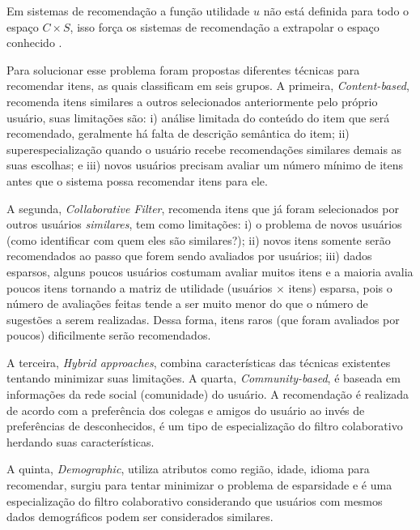 \documentclass{acm_proc_article-sp}
\begin{document}
Em sistemas de recomenda\c{c}{\~a}o a fun\c{c}{\~a}o utilidade \(u\) n{\~a}o est{\'a} definida para todo o espa\c{c}o \(C \times S\), isso for\c{c}a os sistemas de recomenda\c{c}{\~a}o a extrapolar o espa\c{c}o conhecido \cite{Adomavicius2005}.

Para solucionar esse problema foram propostas diferentes t{\'e}cnicas para recomendar itens, as quais \cite{Paiva2013} classificam em seis grupos. A primeira, \emph{Content-based}, recomenda itens similares a outros selecionados anteriormente pelo pr{\'o}prio usu{\'a}rio, suas limita\c{c}{\~o}es s{\~a}o: i) an{\'a}lise limitada do conte{\'u}do do item que ser{\'a} recomendado, geralmente h{\'a} falta de descri\c{c}{\~a}o sem{\^a}ntica do item; ii) superespecializa\c{c}{\~a}o quando o usu{\'a}rio recebe recomenda\c{c}{\~o}es similares demais as suas escolhas; e iii) novos usu{\'a}rios precisam avaliar um n{\'u}mero m{\'i}nimo de itens antes que o sistema possa recomendar itens para ele.

A segunda, \emph{Collaborative Filter}, recomenda itens que j{\'a} foram selecionados por outros usu{\'a}rios \emph{similares}, tem como limita\c{c}{\~o}es: i) o problema de novos usu{\'a}rios (como identificar com quem eles s{\~a}o similares?); ii) novos itens somente ser{\~a}o recomendados ao passo que forem sendo avaliados por usu{\'a}rios; iii) dados esparsos, alguns poucos usu{\'a}rios costumam avaliar muitos itens e a maioria avalia poucos itens tornando a matriz de utilidade (usu{\'a}rios \(\times\) itens) esparsa, pois o n{\'u}mero de avalia\c{c}{\~o}es feitas tende a ser muito menor do que o n{\'u}mero de sugest{\~o}es a serem realizadas. Dessa forma, itens raros (que foram avaliados por poucos) dificilmente ser{\~a}o recomendados.

A terceira, \emph{Hybrid approaches}, combina caracter{\'i}sticas das t{\'e}cnicas existentes tentando minimizar suas limita\c{c}{\~o}es. A quarta, \emph{Community-based}, {\'e} baseada em informa\c{c}{\~o}es da rede social (comunidade) do usu{\'a}rio. A recomenda\c{c}{\~a}o {\'e} realizada de acordo com a prefer{\^e}ncia dos colegas e amigos do usu{\'a}rio ao inv{\'e}s de prefer{\^e}ncias de desconhecidos, {\'e} um tipo de especializa\c{c}{\~a}o do filtro colaborativo herdando suas caracter{\'i}sticas.

A quinta, \emph{Demographic}, utiliza atributos como regi{\~a}o, idade, idioma para recomendar, surgiu para tentar minimizar o problema de esparsidade e {\'e} uma especializa\c{c}{\~a}o do filtro colaborativo considerando que usu{\'a}rios com mesmos dados demogr{\'a}ficos podem ser considerados similares.
\end{document}
